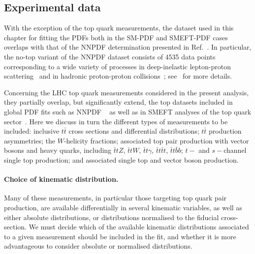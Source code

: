\documentclass[withindex,glossary]{cam-thesis}
\begin{document}
\subsection{Experimental data}
\label{sec:baseline_data}

With the exception of the top quark measurements, the dataset used in
this chapter for fitting the PDFs both in the SM-PDF and SMEFT-PDF cases
overlaps with that of the NNPDF determination presented in Ref.~\cite{NNPDF:2021njg}.
%
In particular,
the no-top variant of the NNPDF dataset consists of 4535 data points
corresponding to a wide variety of processes in
deep-inelastic lepton-proton scattering~\cite{Arneodo:1996kd,Arneodo:1996qe,Whitlow:1991uw,Benvenuti:1989rh,Onengut:2005kv,Goncharov:2001qe,MasonPhD,Abramowicz:2015mha,H1:2018flt}
and in hadronic proton-proton collisions~\cite{Moreno:1990sf,Webb:2003ps,Towell:2001nh,Aaltonen:2010zza,Abazov:2007jy,Abazov:2013rja,D0:2014kma,Abulencia:2007ez,Aad:2011dm,Aaboud:2016btc,Aad:2014qja,Aad:2013iua,Chatrchyan:2012xt,Chatrchyan:2013mza,Chatrchyan:2013tia,Khachatryan:2016pev, Aaij:2012mda,Aaij:2015gna,Aaij:2015vua,Aaij:2015zlq,Aad:2016zzw,Aaboud:2017ffb,Aad:2019rou,Aaij:2016qqz,Aad:2016naf,Aaij:2016mgv,Aad:2015auj,Khachatryan:2015oaa, Aaboud:2017soa, Sirunyan:2017wgx,Aad:2011fc,Aad:2013lpa,Aad:2014vwa,Chatrchyan:2012bja,Khachatryan:2015luy,Aaboud:2017dvo,Khachatryan:2016mlc,Aad:2016xcr,ATLAS:2017nah}; see~\cite{NNPDF:2021njg}
for more details.

Concerning the LHC top quark measurements considered in the present
analysis,
they partially overlap, but significantly extend, the top datasets included in
global PDF fits such as NNPDF ~\cite{NNPDF:2021njg} as well as in SMEFT analyses of the top quark sector~\cite{Ellis:2020unq,Ethier:2021bye}.
%
Here we discuss in turn the different types of measurements to be included: inclusive $t\bar{t}$ cross sections and differential distributions; $t\bar{t}$ production asymmetries; the $W$-helicity fractions;
 associated top pair production with vector bosons and heavy quarks, including $\bar{t}t Z$, $\bar{t}t W$, $\bar{t}t \gamma$, $\bar{t}t\bar{t}t$, $\bar{t}t\bar{b}b$;
 $t-$ and $s-$channel single top production;
 and associated single top and vector boson production.

 \paragraph{Choice of kinematic distribution.}
 Many of these measurements, in particular those targeting
 top quark pair production, are available
  differentially in several kinematic variables,
 as well as either absolute distributions, or distributions normalised
 to the fiducial cross-section.
We must decide which of the
 available kinematic distributions associated to
 a given measurement should be included in the fit,
 and whether it is more advantageous to consider
 absolute or normalised distributions.
 
\end{document}
